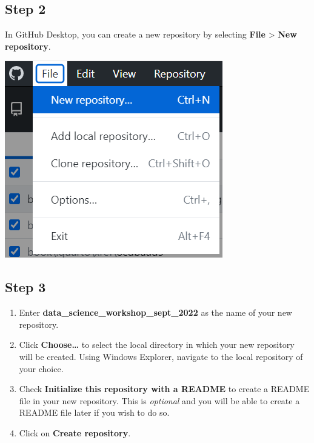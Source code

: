 \documentclass[
  letterpaper,
  DIV=11,
  numbers=noendperiod,
  oneside]{scrreprt}
\providecommand{\tightlist}{%
  \setlength{\itemsep}{0pt}\setlength{\parskip}{0pt}}\usepackage{longtable,booktabs,array}
\begin{document}
\subsection{Step 2}

In GitHub Desktop, you can create a new repository by selecting
\textbf{File} \textgreater{} \textbf{New repository}.

\includegraphics{images/paste-A85BE0C6.png}

\subsection{Step 3}

\begin{enumerate}
\def\labelenumi{\arabic{enumi}.}
\tightlist
\item
  Enter \textbf{data\_science\_workshop\_sept\_2022} as the name of your
  new repository.
\item
  Click \textbf{Choose\ldots{}} to select the local directory in which
  your new repository will be created. Using Windows Explorer, navigate
  to the local repository of your choice.
\item
  Check \textbf{Initialize this repository with a README} to create a
  README file in your new repository. This is \emph{optional} and you
  will be able to create a README file later if you wish to do so.
\item
  Click on \textbf{Create repository}.
\end{enumerate}
\end{document}
